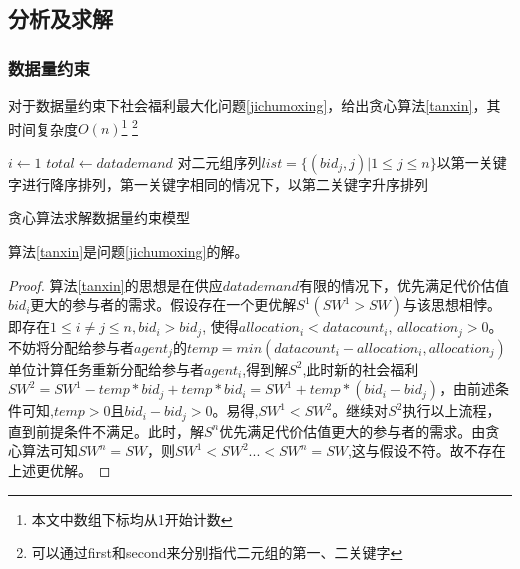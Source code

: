 \documentclass[promaster]{thesis-uestc}
\begin{document}
\FloatBarrier

\subsection{分析及求解}

\subsubsection{数据量约束}

对于数据量约束下社会福利最大化问题\ref{jichumoxing}，给出贪心算法\ref{tanxin}，其时间复杂度$O(n)$\footnote{本文中数组下标均从1开始计数}
\footnote{可以通过first和second来分别指代二元组的第一、二关键字}

\begin{algorithm}[h] 
    $i \leftarrow 1$\;
    $total \leftarrow datademand $\;
    对二元组序列$list = \{(bid_j,j)|1 \leq j \leq n\}$以第一关键字进行降序排列，第一关键字相同的情况下，以第二关键字升序排列\;
\caption{贪心算法求解数据量约束模型}
\label{tanxin}
\end{algorithm}

\begin{theorem}
算法\ref{tanxin}是问题\ref{jichumoxing}的解。
\end{theorem}

\begin{proof}
    算法\ref{tanxin}的思想是在供应$datademand$有限的情况下，优先满足代价估值$bid_i$更大的参与者的需求。假设存在一个更优解$S^1(SW^1 > SW)$与该思想相悖。即存在$1 \leq i \neq j \leq n,bid_i > bid_j$, 使得$allocation_i < datacount_i \text{, } allocation_j > 0$。不妨将分配给参与者$agent_j$的$temp = min(datacount_i - allocation_i,allocation_j)$单位计算任务重新分配给参与者$agent_i$,得到解$S^2$,此时新的社会福利$SW^2= SW^1- temp*bid_j + temp*bid_i=SW^1+temp*(bid_i-bid_j)$，由前述条件可知,$temp > 0$且$bid_i - bid_j > 0$。易得,$SW^1<SW^2 $。继续对$S^2$执行以上流程，直到前提条件不满足。此时，解$S^n$优先满足代价估值更大的参与者的需求。由贪心算法可知$SW^n = SW$，则$SW^1<SW^2...<SW^n=SW$,这与假设不符。故不存在上述更优解。
\end{proof}
\end{document}
